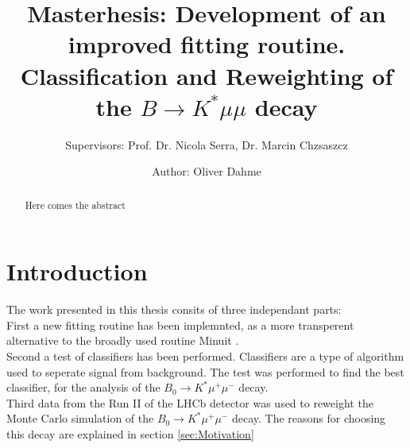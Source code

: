 \documentclass[english]{uzhpub}
\begin{document}
\title{Masterhesis: Development of an improved fitting routine. Classification and Reweighting of the $B \rightarrow K^* \mu \mu$ decay}
\subtitle{Supervisors: Prof. Dr. Nicola Serra, Dr. Marcin Chzsaszcz}

\author{Author: Oliver Dahme}


\maketitle




\begin{abstract}
 Here comes the abstract
\end{abstract}

\tableofcontents


\section{Introduction}



The work presented in this thesis consits of three independant parts: \\
First a new fitting routine has been implemnted, as a more transperent alternative to the broadly used routine Minuit \cite{bib:Minuit}. \\
Second a test of classifiers has been performed. Classifiers are a type of algorithm used to seperate signal from background. The test was performed to find the best classifier, for the analysis of the $B_0 \rightarrow K^* \mu^+ \mu^-$ decay. \\
Third data from the Run II of the LHCb detector was used to reweight the Monte Carlo simulation of the $B_0 \rightarrow K^* \mu^+ \mu^-$ decay.
The reasons for choosing this decay are explained in section \ref{sec:Motivation}
\end{document}
